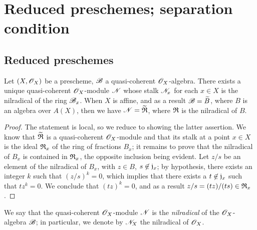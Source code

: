 \section{Reduced preschemes; separation condition}
\label{section-reduced-preschemes-and-separation-condition}

\subsection{Reduced preschemes}
\label{subsection-reduced-preschemes}

\begin{prop}[5.1.1]
\label{1.5.1.1}
Let $(X,\mathscr{O}_X)$ be a prescheme, $\mathscr{B}$ a quasi-coherent $\mathscr{O}_X$-algebra.
There exists a unique quasi-coherent $\mathscr{O}_X$-module $\mathscr{N}$ whose stalk $\mathscr{N}_x$ for each $x\in X$ is the nilradical of the ring $\mathscr{B}_x$.
When $X$ is affine, and as a result $\mathscr{B}=\widetilde{B}$, where $B$ is an algebra over $A(X)$, then we have $\mathscr{N}=\widetilde{\mathfrak{R}}$, where $\mathfrak{R}$ is the nilradical of $B$.
\end{prop}

\begin{proof}
\label{proof-1.5.1.1}
The statement is local, so we reduce to showing the latter assertion.
We know that $\widetilde{\mathfrak{R}}$ is a quasi-coherent $\mathscr{O}_X$-module  and that its stalk at a point $x\in X$ is the ideal $\mathfrak{R}_x$ of the ring of fractions $B_x$; it remains to prove that the nilradical of $B_x$ is contained in $\mathfrak{R}_x$, the opposite inclusion being evident.
Let $z/s$ be an element of the nilradical of $B_x$, with $z\in B$, $s\not\in\mathfrak{j}_x$; by hypothesis, there exists an integer $k$ such that
$(z/s)^k=0$, which implies that there exists a $t\not\in\mathfrak{j}_x$ such that $tz^k=0$.
We conclude that $(tz)^k=0$, and as a result $z/s=(tz)/(ts)\in\mathfrak{R}_x$.
\end{proof}

We say that the quasi-coherent $\mathscr{O}_X$-module $\mathscr{N}$ is the \emph{nilradical} of the $\mathscr{O}_X$-algebra $\mathscr{B}$; in particular, we denote by $\mathscr{N}_X$ the nilradical of $\mathscr{O}_X$.

